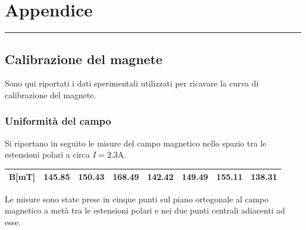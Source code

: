 \newpage
{\centering
\section{Appendice}
}
\medskip
{\color{gray}\hrule}
\medskip
\subsection{Calibrazione del magnete}
Sono qui riportati i dati sperimentali utilizzati per ricavare la curva di
calibrazione del magnete.
\subsubsection{Uniformità del campo}
\label{sec:unif}
Si riportano in seguito le misure del campo magnetico nello spazio tra le estensioni
polari a circa $I=2.3$A.
\begin{table}[ht!]
    \centering
    \begin{tabular}{|c|c|c|c|c|c|c|c|}
	\hline
	\textbf{B[mT]} & 145.85 & 150.43 & 168.49 & 142.42 & 149.49 & 155.11 & 138.31\\
	\hline
    \end{tabular} 
    \label{tab:B_unif}
\end{table}
Le misure sono state prese in cinque punti sul piano ortogonale al campo magnetico
a metà tra le estensioni polari e nei due punti centrali adiacenti ad esse.
